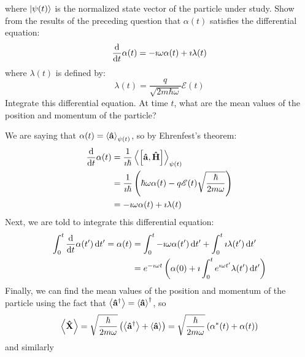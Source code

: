 \documentclass[a4paper,twoside]{article}
\begin{document}
\begin{itemize}
\begin{equation}
        \end{equation}
        where $\ket{\psi(t)} $ is the normalized state vector of the particle under study. Show from the results of the preceding question that $ \alpha(t) $ satisfies the differential equation:
        \begin{equation}
            \dv{t} \alpha(t) = - \imath \omega \alpha(t) + \imath \lambda(t) 
        \end{equation}
        where $ \lambda(t) $ is defined by:
        \begin{equation}
            \lambda(t) = \frac{q}{\sqrt{2m \hbar \omega}} \mathscr{E}(t)
        \end{equation}
        Integrate this differential equation. At time $ t $, what are the mean values of the position and momentum of the particle?
        \begin{problem}
            We are saying that $ \alpha(t) = \ev{ \vu{a}}_{\psi(t)} $, so by Ehrenfest's theorem:
            \begin{align}
                \dv{t} \alpha(t) &= \frac{1}{\imath \hbar} \ev{\comm{ \vu{a}}{ \vu{H}}}_{\psi(t)} \\
                &= \frac{1}{\imath \hbar} \left( \hbar \omega \alpha(t) - q \mathscr{E}(t) \sqrt{\frac{\hbar}{2m \omega}} \right) \\
                &= - \imath \omega \alpha(t) + \imath \lambda(t)
            \end{align}
            Next, we are told to integrate this differential equation:
            \begin{align}
                \int_0^t \dv{t} \alpha(t') \dd{t'} = \alpha(t) &= \int_0^t -\imath \omega \alpha(t') \dd{t'} + \int_0^t \imath \lambda(t') \dd{t'} \\
                &= e^{- \imath \omega t} \left( \alpha(0) + \imath\int_0^t e^{\imath \omega t'} \lambda(t') \dd{t'} \right)
            \end{align}
            Finally, we can find the mean values of the position and momentum of the particle using the fact that $ \ev{ \vu{a}^\dagger} = \ev{ \vu{a}}^\dagger $, so
            \begin{equation}
                \ev{ \vu{X}} = \sqrt{\frac{\hbar}{2m \omega}} \left( \ev{ \vu{a}^\dagger} + \ev{ \vu{a}} \right) = \sqrt{\frac{\hbar}{2m \omega}} \left( \alpha^*(t) + \alpha(t) \right)
            \end{equation}
            and similarly
            \begin{equation}

\end{equation}
\end{problem}
\end{itemize}
\end{document}
